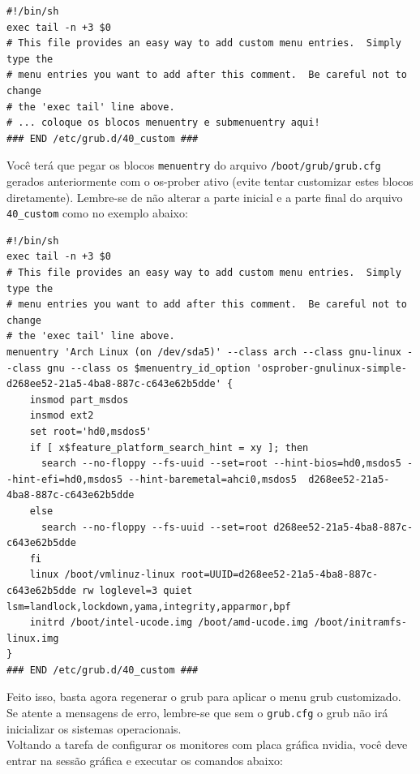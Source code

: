 \documentclass[12pt,a4paper]{article}
\begin{document}
\begin{lstlisting}
#!/bin/sh
exec tail -n +3 $0
# This file provides an easy way to add custom menu entries.  Simply type the
# menu entries you want to add after this comment.  Be careful not to change
# the 'exec tail' line above.
# ... coloque os blocos menuentry e submenuentry aqui!
### END /etc/grub.d/40_custom ###
\end{lstlisting}

\vspace{\baselineskip}

Você terá que pegar os blocos \texttt{menuentry} do arquivo \texttt{/boot/grub/grub.cfg} gerados anteriormente com o os-prober ativo (evite tentar customizar estes blocos diretamente). Lembre-se de não alterar a parte inicial e a parte final do arquivo \texttt{40\_custom} como no exemplo abaixo:\\

\begin{lstlisting}
#!/bin/sh
exec tail -n +3 $0
# This file provides an easy way to add custom menu entries.  Simply type the
# menu entries you want to add after this comment.  Be careful not to change
# the 'exec tail' line above.
menuentry 'Arch Linux (on /dev/sda5)' --class arch --class gnu-linux --class gnu --class os $menuentry_id_option 'osprober-gnulinux-simple-d268ee52-21a5-4ba8-887c-c643e62b5dde' {
	insmod part_msdos
	insmod ext2
	set root='hd0,msdos5'
	if [ x$feature_platform_search_hint = xy ]; then
	  search --no-floppy --fs-uuid --set=root --hint-bios=hd0,msdos5 --hint-efi=hd0,msdos5 --hint-baremetal=ahci0,msdos5  d268ee52-21a5-4ba8-887c-c643e62b5dde
	else
	  search --no-floppy --fs-uuid --set=root d268ee52-21a5-4ba8-887c-c643e62b5dde
	fi
	linux /boot/vmlinuz-linux root=UUID=d268ee52-21a5-4ba8-887c-c643e62b5dde rw loglevel=3 quiet lsm=landlock,lockdown,yama,integrity,apparmor,bpf
	initrd /boot/intel-ucode.img /boot/amd-ucode.img /boot/initramfs-linux.img
}
### END /etc/grub.d/40_custom ###
\end{lstlisting}

\vspace{\baselineskip}

Feito isso, basta agora regenerar o grub para aplicar o menu grub customizado. Se atente a mensagens de erro, lembre-se que sem o \texttt{grub.cfg} o grub não irá inicializar os sistemas operacionais.\\

Voltando a tarefa de configurar os monitores com placa gráfica nvidia, você deve entrar na sessão gráfica e executar os comandos abaixo:\\
\end{document}

